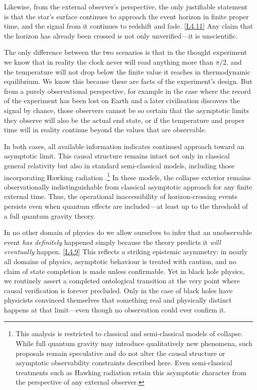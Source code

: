\documentclass[12pt]{book}
\newcounter{logicanchor}
\newenvironment{logicanchorenv}[1]{\refstepcounter{logicanchor}\label{#1}}{}
\newcommand{\logiclink}[2]{\begin{logicanchorenv}{logic:#1}\end{logicanchorenv}\hyperref[appendix:#1]{[#1]}\xspace}
\begin{document}
Likewise, from the external observer's perspective, the only justifiable statement is that the star's surface continues to approach the event horizon in finite proper time, and the signal from it continues to redshift and fade. \logiclink{L4.11}{} Any claim that the horizon has already been crossed is not only unverified---it is unscientific.

The only difference between the two scenarios is that in the thought experiment we know that in reality the clock never will read anything more than $\pi/2$, and the temperature will not drop below the finite value it reaches in thermodynamic equilibrium. We know this because these are facts of the experiment's design. But from a purely observational perspective, for example in the case where the record of the experiment has been lost on Earth and a later civilisation discovers the signal by chance, those observers cannot be so certain that the asymptotic limits they observe will also be the actual end state, or if the temperature and proper time will in reality continue beyond the values that are observable.

In both cases, all available information indicates continued approach toward an asymptotic limit. This causal structure remains intact not only in classical general relativity but also in standard semi-classical models, including those incorporating Hawking radiation \citep{Visser2003, Wald1994}.\footnote{This analysis is restricted to classical and semi-classical models of collapse. While full quantum gravity may introduce qualitatively new phenomena, such proposals remain speculative and do not alter the causal structure or asymptotic observability constraints described here. Even semi-classical treatments such as Hawking radiation retain this asymptotic character from the perspective of any external observer.} In these models, the collapse exterior remains observationally indistinguishable from classical asymptotic approach for any finite external time. Thus, the operational inaccessibility of horizon-crossing events persists even when quantum effects are included---at least up to the threshold of a full quantum gravity theory.

In no other domain of physics do we allow ourselves to infer that an unobservable event \textit{has definitely} happened simply because the theory predicts it \textit{will eventually} happen. \logiclink{L4.9}{} This reflects a striking epistemic asymmetry: in nearly all domains of physics, asymptotic behaviour is treated with caution, and no claim of state completion is made unless confirmable. Yet in black hole physics, we routinely assert a completed ontological transition at the very point where causal verification is forever precluded. Only in the case of black holes have physicists convinced themselves that something real and physically distinct happens at that limit---even though no observation could ever confirm it.
\end{document}
